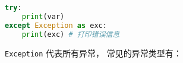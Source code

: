 
\begin{issues}
\issueDraft
\end{issues}

\begin{lstlisting}[language=python]
try:
    print(var)
except Exception as exc:
    print(exc) # 打印错误信息
\end{lstlisting}

\verb|Exception| 代表所有异常， 常见的异常类型有： 